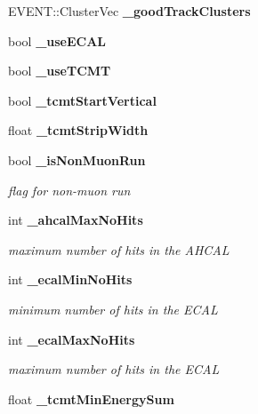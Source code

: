 \begin{DoxyCompactItemize}
\item 
E\-V\-E\-N\-T\-::\-Cluster\-Vec {\bfseries \-\_\-good\-Track\-Clusters}\label{classCALICE_1_1AngleTrackFinder_a7218355d693e3d50095b7a5370bec077}

\item 
bool {\bfseries \-\_\-use\-E\-C\-A\-L}\label{classCALICE_1_1AngleTrackFinder_a1590732ddda798d70bb97bd886a0bc22}

\item 
bool {\bfseries \-\_\-use\-T\-C\-M\-T}\label{classCALICE_1_1AngleTrackFinder_aad59f9038d2f9935f0dd0bd5b9700ed3}

\item 
bool {\bfseries \-\_\-tcmt\-Start\-Vertical}\label{classCALICE_1_1AngleTrackFinder_a7f12d1a7817b3ee3686eefcf70fa0049}

\item 
float {\bfseries \-\_\-tcmt\-Strip\-Width}\label{classCALICE_1_1AngleTrackFinder_a1f5753f67ba97ef9aeb4cb57f75ff309}

\item 
bool {\bf \-\_\-is\-Non\-Muon\-Run}\label{classCALICE_1_1AngleTrackFinder_a599998d50ef67e2bc2e9a07b0864dd3d}

\begin{DoxyCompactList}\small\item\em flag for non-\/muon run \end{DoxyCompactList}\item 
int {\bf \-\_\-ahcal\-Max\-No\-Hits}\label{classCALICE_1_1AngleTrackFinder_a94a071cd5fbe48451c8aace1168f9697}

\begin{DoxyCompactList}\small\item\em maximum number of hits in the A\-H\-C\-A\-L \end{DoxyCompactList}\item 
int {\bf \-\_\-ecal\-Min\-No\-Hits}\label{classCALICE_1_1AngleTrackFinder_a5db8580f90e8193fad643ca4415260ab}

\begin{DoxyCompactList}\small\item\em minimum number of hits in the E\-C\-A\-L \end{DoxyCompactList}\item 
int {\bf \-\_\-ecal\-Max\-No\-Hits}\label{classCALICE_1_1AngleTrackFinder_a305795d0103cb33c9cf579d83d050968}

\begin{DoxyCompactList}\small\item\em maximum number of hits in the E\-C\-A\-L \end{DoxyCompactList}\item 
float {\bf \-\_\-tcmt\-Min\-Energy\-Sum}\label{classCALICE_1_1AngleTrackFinder_ab5ac7f274d7c9936f4d19ed1ac463715}


\end{DoxyCompactItemize}
